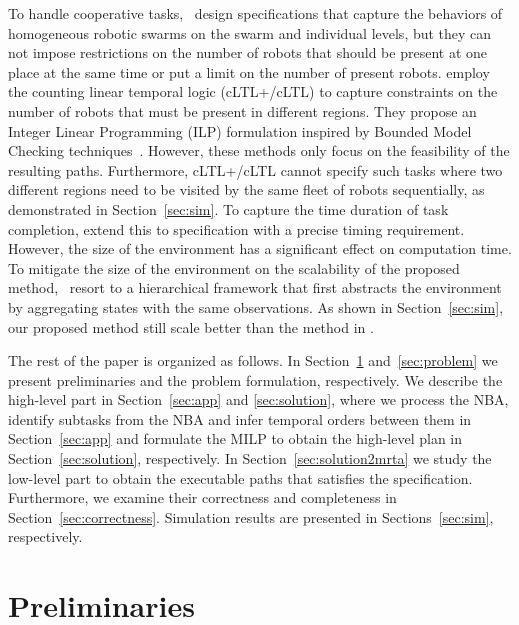 \documentclass[Afour,sageh,times]{sagej}
\begin{document}
To handle cooperative tasks,~\cite{moarref2017decentralized} design specifications that capture the behaviors of homogeneous robotic swarms on the swarm and individual levels, but they can not impose restrictions on the number of robots that should be present at one place at the same time or put a limit on the number of present robots. \cite{sahin2017provably,sahin2017synchronous,sahin2019multirobot} employ the counting linear temporal logic (cLTL+/cLTL) to capture constraints on the number of robots that must be present in different regions. They propose an Integer Linear Programming (ILP) formulation inspired by Bounded Model Checking techniques~\citep{biere2006linear}. However, these methods only focus on the feasibility of the resulting paths. Furthermore, cLTL+/cLTL cannot specify such tasks where two different regions need to be visited by the same fleet of robots sequentially, as demonstrated in Section~\ref{sec:sim}. To capture the time duration of task completion, \cite{JoLeVaSaSeTrBe-ISRR-2019} extend this to specification with a precise timing requirement. However, the size of the environment has a significant effect on computation time. To mitigate the size of the environment on the scalability of the proposed method,~\cite{sahin2019multi} resort to a hierarchical framework that first abstracts the environment by aggregating states with the same observations. As shown in Section~\ref{sec:sim}, our proposed method still scale better than the method in \cite{sahin2019multi}.

The rest of the paper is organized as follows. %
In Section~\ref{sec:preliminaries} and~\ref{sec:problem} we present preliminaries and the problem formulation, respectively. We describe the high-level part in  Section~\ref{sec:app} and \ref{sec:solution}, where we process the NBA, identify subtasks from the NBA and infer temporal orders between them in Section~\ref{sec:app} and formulate the MILP to obtain the high-level plan in Section~\ref{sec:solution}, respectively. In Section~\ref{sec:solution2mrta} we study the low-level part to obtain the executable paths that satisfies the specification.  Furthermore, we examine their correctness and completeness  in Section~\ref{sec:correctness}. Simulation results are presented in Sections~\ref{sec:sim}, respectively.



\section{Preliminaries}\label{sec:preliminaries}
\end{document}
